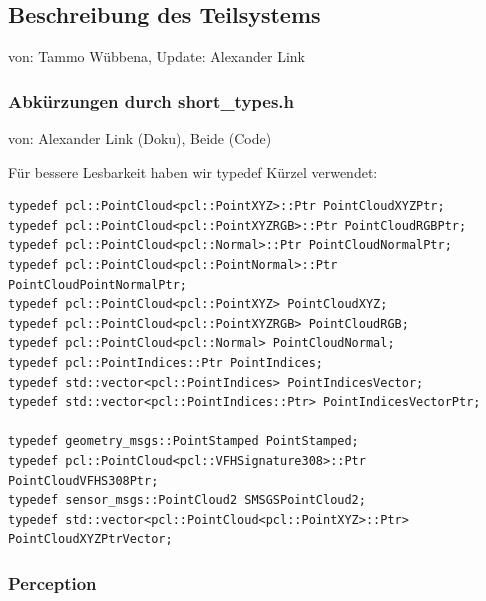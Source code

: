 \documentclass{suturo}
\makeatletter
\newcommand{\chapterauthor}[1]{%
  {\parindent0pt\vspace*{-27pt}%
  \linespread{0}\small\begin{flushright}von: #1\end{flushright}%
  \par\nobreak\vspace*{0pt}}
  \@afterheading%
}
\makeatother
\begin{document}
\begin{figure}[!htb]
\end{figure}
      
\subsection{Beschreibung des Teilsystems}
\chapterauthor{Tammo Wübbena, Update: Alexander Link}

\subsubsection{Abkürzungen durch short\_types.h}
\chapterauthor{Alexander Link (Doku), Beide (Code)}
Für bessere Lesbarkeit haben wir typedef Kürzel verwendet:
\begin{verbatim}
typedef pcl::PointCloud<pcl::PointXYZ>::Ptr PointCloudXYZPtr;
typedef pcl::PointCloud<pcl::PointXYZRGB>::Ptr PointCloudRGBPtr;
typedef pcl::PointCloud<pcl::Normal>::Ptr PointCloudNormalPtr;
typedef pcl::PointCloud<pcl::PointNormal>::Ptr PointCloudPointNormalPtr;
typedef pcl::PointCloud<pcl::PointXYZ> PointCloudXYZ;
typedef pcl::PointCloud<pcl::PointXYZRGB> PointCloudRGB;
typedef pcl::PointCloud<pcl::Normal> PointCloudNormal;
typedef pcl::PointIndices::Ptr PointIndices;
typedef std::vector<pcl::PointIndices> PointIndicesVector;
typedef std::vector<pcl::PointIndices::Ptr> PointIndicesVectorPtr;

typedef geometry_msgs::PointStamped PointStamped;
typedef pcl::PointCloud<pcl::VFHSignature308>::Ptr PointCloudVFHS308Ptr;
typedef sensor_msgs::PointCloud2 SMSGSPointCloud2;
typedef std::vector<pcl::PointCloud<pcl::PointXYZ>::Ptr> PointCloudXYZPtrVector;
\end{verbatim}

\subsubsection*{Perception}
\end{document}
